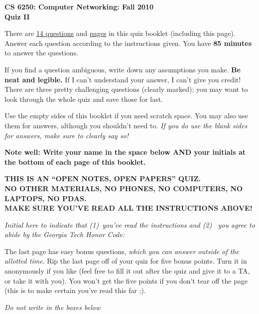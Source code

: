 \documentclass[11pt]{article}
\newcounter{answer}
\begin{document}
\begin{center}
{\Large{\bf CS 6250: Computer Networking: Fall 2010} \\
 \vspace{.15in} \Huge{\bf Quiz II}} 
\vspace{.2in}

\begin{boxedminipage}[h]{6in}
There are \underline{14 questions} and
  \underline{\pageref{lastpage} pages} in this quiz booklet (including
  this page).  Answer each question according to the instructions given.
  You have {\bf 85 minutes} to answer the questions.



\vspace{.1in} 
If you find a question ambiguous, write down any
assumptions you make.  {\bf Be neat and legible.}  If I can't
understand your answer, I can't give you credit!  There are three pretty
challenging questions (clearly marked); you may want to look through the
whole quiz and save those for last.

\vspace{.1in} 
Use the empty sides of this booklet if you need scratch space.  You
may also use them for answers, although you shouldn't need to.  {\em If you
do use the blank sides for answers, make sure to clearly say so!}

\vspace{.1in} 
{\bf Note well: Write your name in the space below AND your initials at the bottom of each
page of this booklet.}

\begin{center}{\bf THIS IS AN ``OPEN NOTES, OPEN PAPERS'' QUIZ.\\
NO OTHER MATERIALS, NO PHONES, NO COMPUTERS, NO LAPTOPS, NO PDAS.\\
MAKE SURE YOU'VE READ ALL THE INSTRUCTIONS ABOVE!}
\end{center}
{\em Initial here to indicate that (1)~you've read the instructions and (2)~
you agree to abide by the Georgia Tech Honor Code: }



\vspace{.05in} The last page has easy bonus questions, {\em which you can
answer outside of the allotted time}.  Rip the last page off of your
quiz for five bonus points.  Turn it in anonymously if you like (feel
free to fill it out after the quiz and give it to a TA, or take it with you).  You
won't get the five points if you don't tear off the page (this is to
make certain you've read this far ;).

\end{boxedminipage}
\end{center}
\vspace*{0.15in}
\begin{center}
{\it Do not write in the boxes below}
\end{center}
\end{document}
